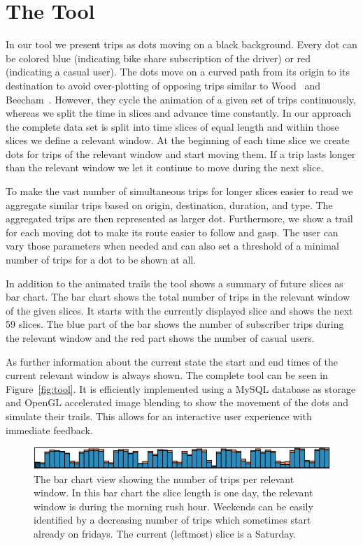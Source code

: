 \section{The Tool}
\label{sec:impl}
In our tool we present trips as dots moving on a black background.
Every dot can be colored blue (indicating bike share subscription of the driver)
or red (indicating a casual user). The dots move on a curved path from
its origin to its destination to avoid over-plotting of opposing trips
similar to Wood~\etal\cite{Wood2011} and
Beecham~\etal\cite{Beecham2012}.
However, they cycle the animation of a given set of trips continuously,
whereas we split the time in slices and advance time constantly.
In our approach the complete data set is split into time slices of equal
length and within those slices we define a relevant window.
At the beginning of each time slice we create dots for trips of the
relevant window and start moving them. If a trip lasts longer than the
relevant window we let it continue to move during the next slice.

To make the vast number of simultaneous trips for longer slices
easier to read we aggregate similar trips based on origin, destination,
duration, and type. The aggregated trips are then represented as larger
dot.
Furthermore, we show a trail for each moving dot to make its
route easier to follow and gasp.
The user can vary those parameters when needed and can also
set a threshold of a minimal number of trips for a dot to be shown at all.

In addition to the animated trails the tool shows a summary of
future slices as bar chart.
The bar chart shows the total number of trips in the relevant window
of the given slices.
It starts with the currently displayed slice and shows the next 59 slices.
The blue part of the bar shows the number of subscriber trips during
the relevant window and the red part shows the number of casual users.

As further information about the current state the start and end times
of the current relevant window is always shown.
The complete tool can be seen in Figure~\ref{fig:tool}.
It is efficiently implemented using a MySQL database as storage and
OpenGL accelerated image blending to show the movement of the dots
and simulate their trails.
This allows for an interactive user experience with immediate feedback.

\begin{figure}
\centering
\includegraphics[width=\linewidth]{images/barchart.png}
\caption{The bar chart view showing the number of trips per relevant
window.
In this bar chart the slice length is one day, the relevant window is
during the morning rush hour.
Weekends can be easily identified by a decreasing number of trips
which sometimes start already on fridays.
The current (leftmost) slice is a Saturday.}
\label{fig:bar}
\end{figure}
